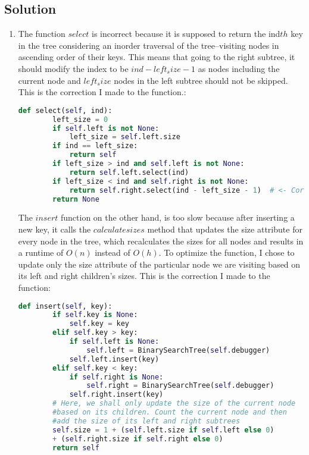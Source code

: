 \documentclass[11pt]{article}
\begin{document}
\begin{enumerate}
\section*{Solution}
\begin{enumerate}
    \item The function $select$ is incorrect because it is supposed to return the 
    ind$th$ key in the tree considering an inorder traversal of the tree--visiting nodes in ascending order of their keys. This means that going to the right subtree, it should modify the index to be $ind - left_size -1$ as nodes including the current node and $left_size$ nodes in the left subtree should not be skipped. This is the correction I made to the function.:
    \begin{lstlisting}[language=Python]
        def select(self, ind):
        left_size = 0
        if self.left is not None:
            left_size = self.left.size
        if ind == left_size:
            return self
        if left_size > ind and self.left is not None:
            return self.left.select(ind)
        if left_size < ind and self.right is not None:
            return self.right.select(ind - left_size - 1)  # <- Corrected
        return None
    \end{lstlisting}
    The $insert$ function on the other hand, is too slow because after inserting a new key, it calls the $calculatesizes$ method that updates the size attribute for every node in the tree, which recalculates the sizes for all nodes and results in a runtime of $O(n)$ instead of $O(h)$. To optimize the function, I chose to update only the size attribute of the particular node we are visiting based on its left and right children's sizes. This is the correction I made to the function: 
    \begin{lstlisting}[language=Python]
        def insert(self, key):
        if self.key is None:
            self.key = key
        elif self.key > key: 
            if self.left is None:
                self.left = BinarySearchTree(self.debugger)
            self.left.insert(key)
        elif self.key < key:
            if self.right is None:
                self.right = BinarySearchTree(self.debugger)
            self.right.insert(key)
        # Here, we shall only update the size of the current node 
        #based on its children. Count the current node and then 
        #add the size of its left and right subtrees
        self.size = 1 + (self.left.size if self.left else 0) 
        + (self.right.size if self.right else 0)
        return self
    

\end{lstlisting}
\end{enumerate}
\end{enumerate}
\end{document}
